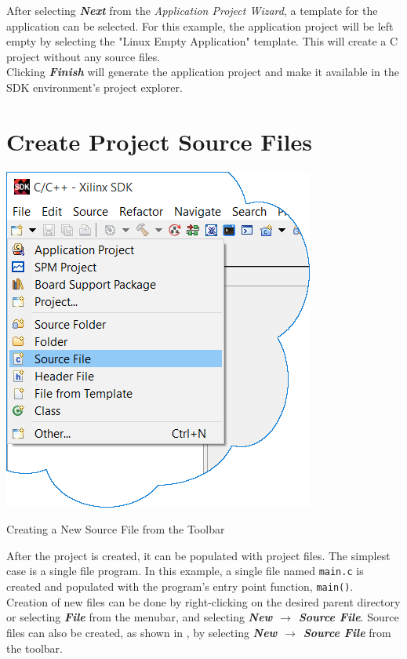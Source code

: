 \noindent
After selecting \textit{\bfseries Next} from the \textit{Application Project Wizard}, a template for the application can be selected. For this example, the application project will be left empty by selecting the "Linux Empty Application" template. This will create a C project without any source files. \\



\noindent
Clicking \textit{\bfseries Finish} will generate the application project and make it available in the SDK environment's project explorer. 


\section{Create Project Source Files}


\begin{marginfigure}
	\centering
	\includegraphics{images/New_File.png}
	\caption[Creating a New Source File from the Toolbar]{Creating a New Source File from the Toolbar}
	\label{fig:newfiletoolbar}
\end{marginfigure}


After the project is created, it can be populated with project files. The simplest case is a single file program. In this example, a single file named \texttt{main.c} is created and populated with the program's entry point function, \Verb|main()|. \\


\noindent
Creation of new files can be done by right-clicking on the desired parent directory or selecting \textit{\bfseries File} from the menubar, and selecting \textit{\bfseries New $\rightarrow$ Source File}. Source files can also be created, as shown in , by selecting \textit{\bfseries New $\rightarrow$ Source File} from the toolbar. \\

